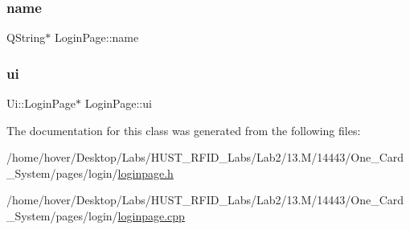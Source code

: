 \subsubsection{\texorpdfstring{name}{name}}
{\footnotesize\ttfamily Q\+String$\ast$ Login\+Page\+::name\hspace{0.3cm}{\ttfamily [private]}}

\mbox{\label{class_login_page_a427700feff04d4252d0b9d406740bcc5}} 
\subsubsection{\texorpdfstring{ui}{ui}}
{\footnotesize\ttfamily Ui\+::\+Login\+Page$\ast$ Login\+Page\+::ui\hspace{0.3cm}{\ttfamily [private]}}



The documentation for this class was generated from the following files\+:\begin{DoxyCompactItemize}
\item 
/home/hover/\+Desktop/\+Labs/\+H\+U\+S\+T\+\_\+\+R\+F\+I\+D\+\_\+\+Labs/\+Lab2/13.\+M/14443/\+One\+\_\+\+Card\+\_\+\+System/pages/login/\mbox{\hyperlink{loginpage_8h}{loginpage.\+h}}\item 
/home/hover/\+Desktop/\+Labs/\+H\+U\+S\+T\+\_\+\+R\+F\+I\+D\+\_\+\+Labs/\+Lab2/13.\+M/14443/\+One\+\_\+\+Card\+\_\+\+System/pages/login/\mbox{\hyperlink{loginpage_8cpp}{loginpage.\+cpp}}\end{DoxyCompactItemize}
